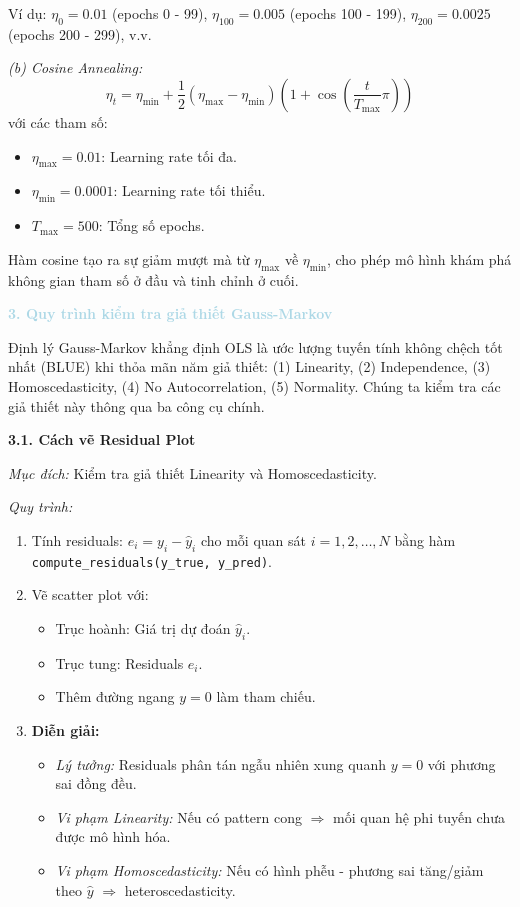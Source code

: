 Ví dụ: $\eta_0 = 0.01$ (epochs 0 - 99), $\eta_{100} = 0.005$ (epochs 100 - 199), $\eta_{200} = 0.0025$ (epochs 200 - 299), v.v.

\textit{(b) Cosine Annealing:}
\begin{equation}
\eta_t = \eta_{\min} + \frac{1}{2}(\eta_{\max} - \eta_{\min}) \left(1 + \cos\left(\frac{t}{T_{\max}} \pi\right)\right)
\end{equation}
với các tham số:
\begin{itemize}
    \item $\eta_{\max} = 0.01$: Learning rate tối đa.
    \item $\eta_{\min} = 0.0001$: Learning rate tối thiểu.
    \item $T_{\max} = 500$: Tổng số epochs.
\end{itemize}

Hàm cosine tạo ra sự giảm mượt mà từ $\eta_{\max}$ về $\eta_{\min}$, cho phép mô hình khám phá không gian tham số ở đầu và tinh chỉnh ở cuối.

\vspace{0.5em}
\noindent\textcolor{lightblue}{\textbf{3. Quy trình kiểm tra giả thiết Gauss-Markov}}
\vspace{0.5em}

Định lý Gauss-Markov khẳng định OLS là ước lượng tuyến tính không chệch tốt nhất (BLUE) khi thỏa mãn năm giả thiết: (1) Linearity, (2) Independence, (3) Homoscedasticity, (4) No Autocorrelation, (5) Normality. Chúng ta kiểm tra các giả thiết này thông qua ba công cụ chính.

\textbf{3.1. Cách vẽ Residual Plot}

\textit{Mục đích:} Kiểm tra giả thiết Linearity và Homoscedasticity.

\textit{Quy trình:}
\begin{enumerate}
    \item Tính residuals: $e_i = y_i - \hat{y}_i$ cho mỗi quan sát $i = 1, 2, \ldots, N$ bằng hàm \texttt{compute\_residuals(y\_true, y\_pred)}.
    
    \item Vẽ scatter plot với:
    \begin{itemize}
        \item Trục hoành: Giá trị dự đoán $\hat{y}_i$.
        \item Trục tung: Residuals $e_i$.
        \item Thêm đường ngang $y = 0$ làm tham chiếu.
    \end{itemize}
    
    \item \textbf{Diễn giải:}
    \begin{itemize}
        \item \textit{Lý tưởng:} Residuals phân tán ngẫu nhiên xung quanh $y = 0$ với phương sai đồng đều.
        \item \textit{Vi phạm Linearity:} Nếu có pattern cong $\Rightarrow$ mối quan hệ phi tuyến chưa được mô hình hóa.
        \item \textit{Vi phạm Homoscedasticity:} Nếu có hình phễu - phương sai tăng/giảm theo $\hat{y}$ $\Rightarrow$ heteroscedasticity.
    \end{itemize}
\end{enumerate}

